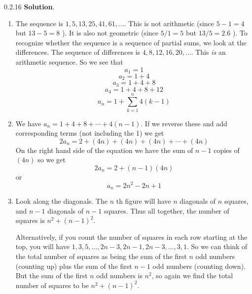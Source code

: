 \documentclass[11pt,]{book}
\theoremstyle{ptxplainnotitle}
\theoremstyle{ptxplaintitle}
\theoremstyle{ptxdefinitionnotitle}
\theoremstyle{ptxdefinitiontitle}
\theoremstyle{ptxdefinitionnotitle}
\theoremstyle{ptxdefinitiontitle}
\theoremstyle{ptxdefinitionnotitle}
\theoremstyle{ptxdefinitiontitle}
\theoremstyle{ptxdefinitiontitlenonumber}
\theoremstyle{ptxdefinitiontitlenonumber}
\numberwithin{equation}{chapter}
\begin{document}
\begin{divisionexercise}{0.2.16}
\textbf{Solution}.\quad%
\hypertarget{p-354}{}%
\leavevmode%
\begin{enumerate}[label=(\alph*)]
\item\hypertarget{li-202}{}\hypertarget{p-355}{}%
The sequence is \(1, 5, 13, 25, 41, 61, \ldots\).  This is not arithmetic (since \(5-1 = 4\) but \(13-5 = 8\) ).  It is also not geometric (since \(5/1 = 5\) but \(13/5 = 2.6\) ).  To recognize whether the sequence is a sequence of partial sums, we look at the differences.  The sequence of differences is \(4, 8, 12, 16, 20, \ldots\).  This {\em is} an arithmetic sequence.  So we see that%
\begin{equation*}
a_1 = 1
\end{equation*}
%
\begin{equation*}
a_2 = 1+4
\end{equation*}
%
\begin{equation*}
a_3 = 1+4+8
\end{equation*}
%
\begin{equation*}
a_4 = 1+4+8+12
\end{equation*}
%
\begin{equation*}
a_n = 1 + \sum_{k = 1}^n 4(k-1)
\end{equation*}
%
\item\hypertarget{li-203}{}\hypertarget{p-356}{}%
We have \(a_n = 1 + 4 + 8 + \cdots + 4(n-1)\).  If we reverse these and add corresponding terms (not including the 1) we get%
\begin{equation*}
2a_n = 2 + (4n) + (4n) + (4n) + \cdots + (4n)
\end{equation*}
On the right hand side of the equation we have the sum of \(n-1\) copies of \((4n)\) so we get%
\begin{equation*}
2a_n = 2 + (n-1)(4n)
\end{equation*}
or%
\begin{equation*}
a_n = 2n^2 - 2n + 1
\end{equation*}
%
\item\hypertarget{li-204}{}\hypertarget{p-357}{}%
Look along the diagonals.  The \(n\) th figure will have \(n\) diagonals of \(n\) squares, and \(n-1\) diagonals of \(n-1\) squares.  Thus all together, the number of squares is \(n^2 + (n-1)^2\).%
\par
\hypertarget{p-358}{}%
Alternatively, if you count the number of squares in each row starting at the top, you will have \(1, 3, 5, \ldots, 2n-3, 2n-1, 2n-3, \ldots, 3, 1\).  So we can think of the total number of squares as being the sum of the first \(n\) odd numbers (counting up) plus the sum of the first \(n-1\) odd numbers (counting down).  But the sum of the first \(n\) odd numbers is \(n^2\), so again we find the total number of squares to be \(n^2 + (n-1)^2\).%

\end{enumerate}
\end{divisionexercise}
\end{document}
